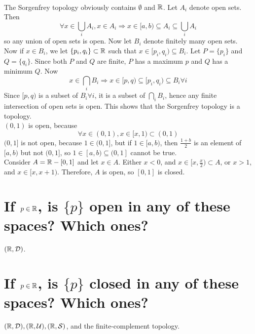 \begin{solution}
 \\The Sorgenfrey topology obviously contains $\emptyset$ and $\mathbb{R}$. Let $A_i$ denote open sets. Then
 $$\forall x \in \bigcup_i A_i, x \in A_i \Rightarrow x \in [a,b) \subseteq A_i \subseteq \bigcup_i A_i$$
 so any union of open sets is open. Now let $B_i$ denote finitely many open sets. Now if $x \in B_i$, we let $\{p_i,q_i\} \subset \mathbb{R}$ such that $x \in [p_i,q_i) \subseteq B_i$. Let $P = \{p_i\}$ and $Q = \{q_i\}$. Since both $P$ and $Q$ are finite, $P$ has a maximum $p$ and $Q$ has a minimum $Q$.
 Now
 $$x \in \bigcap_i B_i \Rightarrow x \in [p,q) \subseteq [p_i,q_i) \subseteq B_i \forall i$$
 Since $[p,q)$ is a subset of $B_i \forall i$, it is a subset of $\bigcap_i B_i$, hence any finite intersection of open sets is open. This shows that the Sorgenfrey topology is a topology. \\
 $(0,1)$ is open, because
 $$\forall x \in (0,1), x \in [x,1) \subset (0,1)$$
 $(0,1]$ is not open, because $1 \in (0,1]$, but if $1 \in [a,b)$, then $\frac{1+b}{2}$ is an element of $[a,b)$ but not $(0,1]$, so $1 \in [a,b) \subseteq (0,1]$ cannot be true. \\
 Consider $A = \mathbb{R} - [0,1]$ and let $x \in A$. Either $x < 0$, and $x \in [x,\frac{x}{2}) \subset A$, or $x > 1$, and $x \in [x,x+1)$. Therefore, $A$ is open, so $[0,1]$ is closed.
\end{solution}


\begin{parts}
 
 \part{If $p \in \mathbb{R}$, is $\{p\}$ open in any of these spaces? Which ones?}
 
 
\begin{solution}
 $(\mathbb{R}, \mathcal{D})$. 
\end{solution}

\part{If $p \in \mathbb{R}$, is $\{p\}$ closed in any of these spaces? Which ones?}

\begin{solution}
$(\mathbb{R}, \mathcal{D}), (\mathbb{R}, \mathcal{U}), (\mathbb{R}, \mathcal{S})$, and the finite-complement topology.
\end{solution}

\end{parts}

